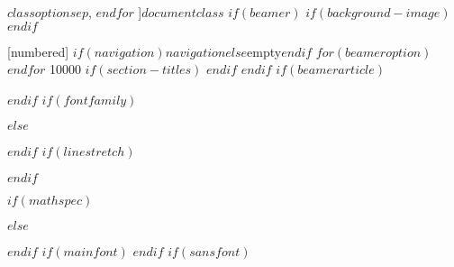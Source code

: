   $classoption$$sep$,
$endfor$
]{$documentclass$}
$if(beamer)$
$if(background-image)$
$endif$
\usepackage{pgfpages}
[numbered]
\beamertemplatenavigationsymbols$if(navigation)$$navigation$$else$empty$endif$
$for(beameroption)$
$endfor$
 10000
\raggedbottom
$if(section-titles)$
\AtBeginPart{
  \frame{\partpage}
}
\AtBeginSection{
  \ifbibliography
  \else
    \frame{\sectionpage}
  \fi
}
\AtBeginSubsection{
  \frame{\subsectionpage}
}
$endif$
$endif$
$if(beamerarticle)$
\usepackage{beamerarticle} %
$endif$
$if(fontfamily)$
\usepackage[$for(fontfamilyoptions)$$fontfamilyoptions$$sep$,$endfor$]{$fontfamily$}
$else$
\usepackage{lmodern}
$endif$
$if(linestretch)$
\usepackage{setspace}
$endif$
\usepackage{amssymb,amsmath}
\usepackage{ifxetex,ifluatex}
\fi{} %
  \usepackage[$if(fontenc)$$fontenc$$else$T1$endif$]{fontenc}
  \usepackage[utf8]{inputenc}
  \usepackage{textcomp} %
\else %
$if(mathspec)$
  \ifxetex
    \usepackage{mathspec}
  \else
    \usepackage{unicode-math}
  \fi
$else$
  \usepackage{unicode-math}
$endif$
$if(mainfont)$
$endif$
$if(sansfont)$
$$
